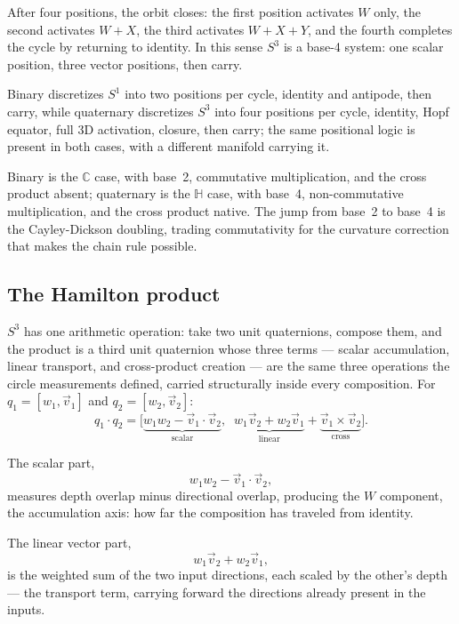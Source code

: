 \documentclass[12pt]{article}
\begin{document}
After four positions, the orbit closes: the first position activates $W$ only, the second activates $W{+}X$, the third activates $W{+}X{+}Y$, and the fourth completes the cycle by returning to identity. In this sense $S^3$ is a base-4 system: one scalar position, three vector positions, then carry.

Binary discretizes $S^1$ into two positions per cycle, identity and antipode, then carry, while quaternary discretizes $S^3$ into four positions per cycle, identity, Hopf equator, full 3D activation, closure, then carry; the same positional logic is present in both cases, with a different manifold carrying it.

Binary is the $\mathbb{C}$ case, with base~2, commutative multiplication, and the cross product absent; quaternary is the $\mathbb{H}$ case, with base~4, non-commutative multiplication, and the cross product native. The jump from base~2 to base~4 is the Cayley-Dickson doubling, trading commutativity for the curvature correction that makes the chain rule possible.


\subsection{The Hamilton product}

$S^3$ has one arithmetic operation: take two unit quaternions, compose them, and the product is a third unit quaternion whose three terms --- scalar accumulation, linear transport, and cross-product creation --- are the same three operations the circle measurements defined, carried structurally inside every composition. For $q_1 = [w_1, \vec{v}_1]$ and $q_2 = [w_2, \vec{v}_2]$:
\begin{equation}\label{eq:hamilton}
    q_1 \cdot q_2 = \bigl[\underbrace{w_1 w_2 - \vec{v}_1 \cdot \vec{v}_2}_{\text{scalar}},\;\;
    \underbrace{w_1 \vec{v}_2 + w_2 \vec{v}_1}_{\text{linear}} +
    \underbrace{\vec{v}_1 \times \vec{v}_2}_{\text{cross}}\bigr].
\end{equation}

The scalar part,
\[
    w_1w_2 - \vec{v}_1\cdot\vec{v}_2,
\]
measures depth overlap minus directional overlap, producing the $W$ component, the accumulation axis: how far the composition has traveled from identity.

The linear vector part,
\[
    w_1\vec{v}_2 + w_2\vec{v}_1,
\]
is the weighted sum of the two input directions, each scaled by the other's depth --- the transport term, carrying forward the directions already present in the inputs.
\end{document}
